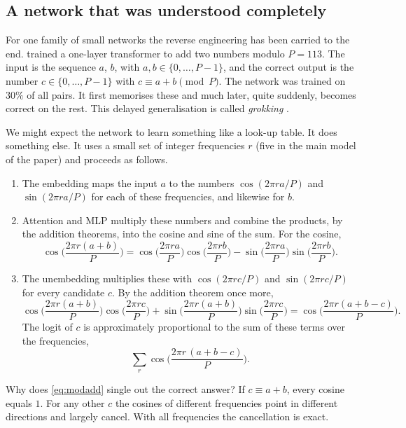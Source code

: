 \subsection{A network that was understood completely}
\label{sec:modadd}

For one family of small networks the reverse engineering has been carried to the end.
\citet{nanda2023progress} trained a one-layer transformer to add two numbers modulo $P=113$. The input is the
sequence $a$, $b$, \tok{=} with $a,b\in\{0,\dots,P-1\}$, and the correct output is the number
$c\in\{0,\dots,P-1\}$ with $c\equiv a+b \pmod P$. The network was trained on $30\%$ of all pairs. It first
memorises these and much later, quite suddenly, becomes correct on the rest. This delayed generalisation is
called \emph{grokking} \citep{power2022grokking}.

We might expect the network to learn something like a look-up table. It does something else. It uses a small
set of integer frequencies $r$ (five in the main model of the paper) and proceeds as follows.
\begin{enumerate}
\item The embedding maps the input $a$ to the numbers $\cos(2\pi ra/P)$ and $\sin(2\pi ra/P)$ for each of these
frequencies, and likewise for $b$.
\item Attention and MLP multiply these numbers and combine the products, by the addition theorems, into the
cosine and sine of the sum. For the cosine,
\[
\cos\!\Big(\frac{2\pi r(a+b)}{P}\Big)=\cos\!\Big(\frac{2\pi ra}{P}\Big)\cos\!\Big(\frac{2\pi rb}{P}\Big)
-\sin\!\Big(\frac{2\pi ra}{P}\Big)\sin\!\Big(\frac{2\pi rb}{P}\Big).
\]
\item The unembedding multiplies these with $\cos(2\pi rc/P)$ and $\sin(2\pi rc/P)$ for every candidate $c$.
By the addition theorem once more,
\[
\cos\!\Big(\frac{2\pi r(a+b)}{P}\Big)\cos\!\Big(\frac{2\pi rc}{P}\Big)
+\sin\!\Big(\frac{2\pi r(a+b)}{P}\Big)\sin\!\Big(\frac{2\pi rc}{P}\Big)
=\cos\!\Big(\frac{2\pi r(a+b-c)}{P}\Big).
\]
The logit of $c$ is approximately proportional to the sum of these terms over the frequencies,
\begin{equation}\label{eq:modadd}
\sum_{r}\cos\!\Big(\frac{2\pi r\,(a+b-c)}{P}\Big).
\end{equation}
\end{enumerate}

Why does \eqref{eq:modadd} single out the correct answer? If $c\equiv a+b$, every cosine equals $1$. For any
other $c$ the cosines of different frequencies point in different directions and largely cancel. With all
frequencies the cancellation is exact.

